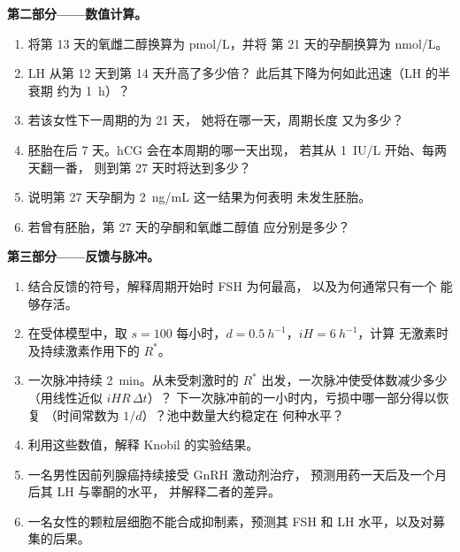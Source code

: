 \begin{problem}
\medskip
\noindent\textbf{第二部分——数值计算。}
\begin{enumerate}[resume]
  \item 将第 13 天的氧雌二醇换算为 \unit{pmol/L}，并将
        第 21 天的孕酮换算为 \unit{nmol/L}。
  \item LH 从第 12 天到第 14 天升高了多少倍？
        此后其下降为何如此迅速（LH 的半衰期
        约为 \qty{1}{h}）？
  \item 若该女性下一周期的为 21 天，
        她将在哪一天，周期长度
        又为多少？
  \item 胚胎在后 7 天。hCG 会在本周期的哪一天出现，
        若其从 \qty{1}{IU/L} 开始、每两天翻一番，
        则到第 27 天时将达到多少？
  \item 说明第 27 天孕酮为 \qty{2}{ng/mL} 这一结果为何表明
        未发生胚胎。
  \item 若曾有胚胎，第 27 天的孕酮和氧雌二醇值
        应分别是多少？
\end{enumerate}

\medskip
\noindent\textbf{第三部分——反馈与脉冲。}
\begin{enumerate}[resume]
  \item 结合反馈的符号，解释周期开始时 FSH 为何最高，
        以及为何通常只有一个
        能够存活。
  \item 在受体模型中，取 $s = 100$ 每小时，$d =
        \qty{0.5}{h^{-1}}$，$iH = \qty{6}{h^{-1}}$，计算
        无激素时及持续激素作用下的 $R^*$。
  \item 一次脉冲持续 \qty{2}{min}。从未受刺激时的
        $R^*$ 出发，一次脉冲使受体数减少多少（用线性近似
        $iHR\,\Delta t$）？
        下一次脉冲前的一小时内，亏损中哪一部分得以恢复
        （时间常数为 $1/d$）？池中数量大约稳定在
        何种水平？
  \item 利用这些数值，解释 Knobil 的实验结果。
  \item 一名男性因前列腺癌持续接受 GnRH 激动剂治疗，
        预测用药一天后及一个月后其 LH 与睾酮的水平，
        并解释二者的差异。
  \item 一名女性的颗粒层细胞不能合成抑制素，预测其
        FSH 和 LH 水平，以及对募集的后果。
\end{enumerate}


\end{problem}
